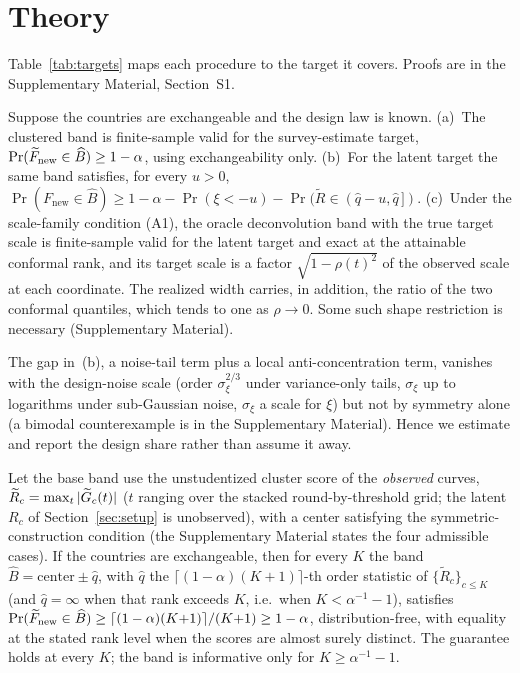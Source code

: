 \section{Theory}\label{sec:theory}

Table~\ref{tab:targets} maps each procedure to the target it covers. Proofs
are in the Supplementary Material, Section~S1.

\begin{theorem}\label{thm:oracle}
Suppose the countries are exchangeable and the design law is known.
(a)~The clustered band is finite-sample valid for the survey-estimate target,
$\Pr(\widetilde{F}_{\text{new}}\in\widehat B)\ge1-\alpha$, using exchangeability only.
(b)~For the latent target the same band satisfies, for every $u>0$,
$\Pr(F_{\text{new}}\in\widehat B)\ge1-\alpha-\Pr(\xi<-u)-
\Pr(\widetilde R\in(\widehat q-u,\widehat q\,])$.
(c)~Under the scale-family condition (A1), the oracle deconvolution band
with the true target scale is finite-sample valid for the latent target and
exact at the attainable conformal rank, and its target scale is a factor
$\sqrt{1-\rho(t)^2}$ of the observed scale at each coordinate. The realized
width carries, in addition, the ratio of the two conformal quantiles, which
tends to one as $\rho\to0$. Some such shape restriction is necessary
(Supplementary Material).
\end{theorem}

The gap in~(b), a noise-tail term plus a local anti-concentration term,
vanishes with the design-noise scale (order $\sigma_\xi^{2/3}$ under
variance-only tails, $\sigma_\xi$ up to logarithms under sub-Gaussian
noise, $\sigma_\xi$ a scale for $\xi$) but not by symmetry alone (a bimodal
counterexample is in the Supplementary Material). Hence we estimate and
report the design share rather than assume it away.

\begin{theorem}\label{thm:exact}
Let the base band use the unstudentized cluster score of the \emph{observed}
curves, $\widetilde R_c=\max_t|\widetilde{G}_c(t)|$ ($t$ ranging over the
stacked round-by-threshold grid; the latent $R_c$ of
Section~\ref{sec:setup} is unobserved), with a center satisfying the
symmetric-construction condition (the Supplementary Material states the four
admissible cases). If the countries are exchangeable, then for every $K$ the
band $\widehat B=\text{center}\pm\widehat q$, with $\widehat q$ the
$\lceil(1-\alpha)(K{+}1)\rceil$-th order statistic of
$\{\widetilde R_c\}_{c\le K}$ (and $\widehat q=\infty$ when that rank
exceeds $K$, i.e.\ when $K<\alpha^{-1}-1$), satisfies
$\Pr(\widetilde{F}_{\text{new}}\in\widehat B)\ge\lceil(1-\alpha)(K{+}1)\rceil/(K{+}1)\ge1-\alpha$,
distribution-free, with equality at the stated rank level when the scores are
almost surely distinct. The guarantee holds at every $K$; the band is
informative only for $K\ge\alpha^{-1}-1$.
\end{theorem}

